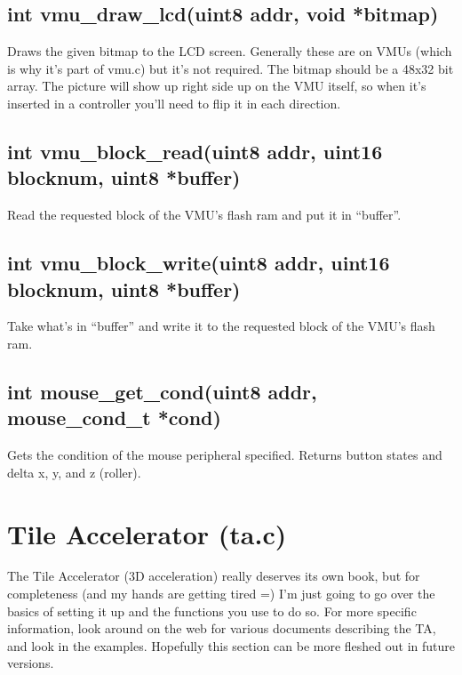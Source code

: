 \documentclass[english]{report}
\begin{document}
\subsection{int vmu\_draw\_lcd(uint8 addr, void *bitmap)}

Draws the given bitmap to the LCD screen. Generally these are on VMUs
(which is why it's part of vmu.c) but it's not required. The bitmap
should be a 48x32 bit array. The picture will show up right side up
on the VMU itself, so when it's inserted in a controller you'll need
to flip it in each direction.


\subsection{int vmu\_block\_read(uint8 addr, uint16 blocknum, uint8 *buffer)}

Read the requested block of the VMU's flash ram and put it in ``buffer''.


\subsection{int vmu\_block\_write(uint8 addr, uint16 blocknum, uint8 *buffer)}

Take what's in ``buffer'' and write it to the requested block
of the VMU's flash ram.


\subsection{int mouse\_get\_cond(uint8 addr, mouse\_cond\_t *cond)}

Gets the condition of the mouse peripheral specified. Returns button
states and delta x, y, and z (roller).


\section{Tile Accelerator (ta.c)}

The Tile Accelerator (3D acceleration) really deserves its own book,
but for completeness (and my hands are getting tired =) I'm just going
to go over the basics of setting it up and the functions you use to
do so. For more specific information, look around on the web for various
documents describing the TA, and look in the examples. Hopefully this
section can be more fleshed out in future versions.
\end{document}
